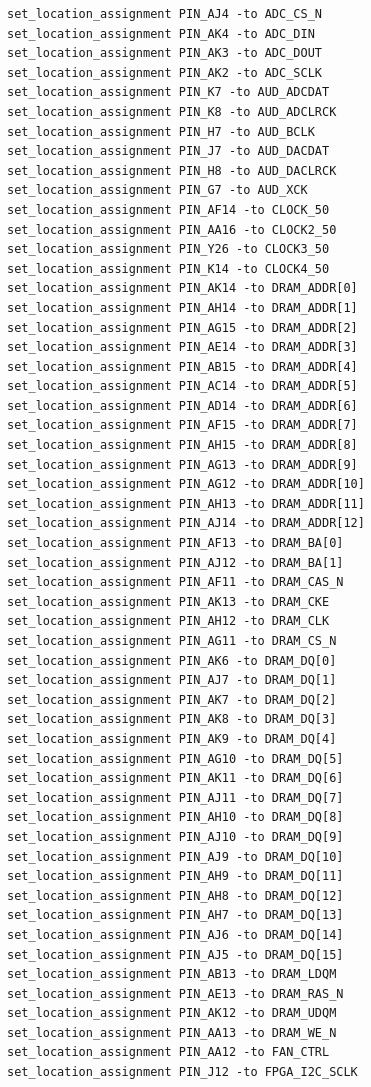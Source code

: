 \documentclass[conference]{IEEEtran}
\begin{document}
\begin{lstlisting}
set_location_assignment PIN_AJ4 -to ADC_CS_N
set_location_assignment PIN_AK4 -to ADC_DIN
set_location_assignment PIN_AK3 -to ADC_DOUT
set_location_assignment PIN_AK2 -to ADC_SCLK
set_location_assignment PIN_K7 -to AUD_ADCDAT
set_location_assignment PIN_K8 -to AUD_ADCLRCK
set_location_assignment PIN_H7 -to AUD_BCLK
set_location_assignment PIN_J7 -to AUD_DACDAT
set_location_assignment PIN_H8 -to AUD_DACLRCK
set_location_assignment PIN_G7 -to AUD_XCK
set_location_assignment PIN_AF14 -to CLOCK_50
set_location_assignment PIN_AA16 -to CLOCK2_50
set_location_assignment PIN_Y26 -to CLOCK3_50
set_location_assignment PIN_K14 -to CLOCK4_50
set_location_assignment PIN_AK14 -to DRAM_ADDR[0]
set_location_assignment PIN_AH14 -to DRAM_ADDR[1]
set_location_assignment PIN_AG15 -to DRAM_ADDR[2]
set_location_assignment PIN_AE14 -to DRAM_ADDR[3]
set_location_assignment PIN_AB15 -to DRAM_ADDR[4]
set_location_assignment PIN_AC14 -to DRAM_ADDR[5]
set_location_assignment PIN_AD14 -to DRAM_ADDR[6]
set_location_assignment PIN_AF15 -to DRAM_ADDR[7]
set_location_assignment PIN_AH15 -to DRAM_ADDR[8]
set_location_assignment PIN_AG13 -to DRAM_ADDR[9]
set_location_assignment PIN_AG12 -to DRAM_ADDR[10]
set_location_assignment PIN_AH13 -to DRAM_ADDR[11]
set_location_assignment PIN_AJ14 -to DRAM_ADDR[12]
set_location_assignment PIN_AF13 -to DRAM_BA[0]
set_location_assignment PIN_AJ12 -to DRAM_BA[1]
set_location_assignment PIN_AF11 -to DRAM_CAS_N
set_location_assignment PIN_AK13 -to DRAM_CKE
set_location_assignment PIN_AH12 -to DRAM_CLK
set_location_assignment PIN_AG11 -to DRAM_CS_N
set_location_assignment PIN_AK6 -to DRAM_DQ[0]
set_location_assignment PIN_AJ7 -to DRAM_DQ[1]
set_location_assignment PIN_AK7 -to DRAM_DQ[2]
set_location_assignment PIN_AK8 -to DRAM_DQ[3]
set_location_assignment PIN_AK9 -to DRAM_DQ[4]
set_location_assignment PIN_AG10 -to DRAM_DQ[5]
set_location_assignment PIN_AK11 -to DRAM_DQ[6]
set_location_assignment PIN_AJ11 -to DRAM_DQ[7]
set_location_assignment PIN_AH10 -to DRAM_DQ[8]
set_location_assignment PIN_AJ10 -to DRAM_DQ[9]
set_location_assignment PIN_AJ9 -to DRAM_DQ[10]
set_location_assignment PIN_AH9 -to DRAM_DQ[11]
set_location_assignment PIN_AH8 -to DRAM_DQ[12]
set_location_assignment PIN_AH7 -to DRAM_DQ[13]
set_location_assignment PIN_AJ6 -to DRAM_DQ[14]
set_location_assignment PIN_AJ5 -to DRAM_DQ[15]
set_location_assignment PIN_AB13 -to DRAM_LDQM
set_location_assignment PIN_AE13 -to DRAM_RAS_N
set_location_assignment PIN_AK12 -to DRAM_UDQM
set_location_assignment PIN_AA13 -to DRAM_WE_N
set_location_assignment PIN_AA12 -to FAN_CTRL
set_location_assignment PIN_J12 -to FPGA_I2C_SCLK

\end{lstlisting}
\end{document}
